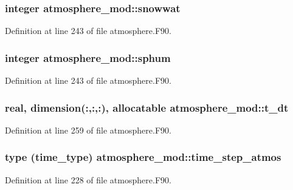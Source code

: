 \subsubsection[{snowwat}]{\setlength{\rightskip}{0pt plus 5cm}integer atmosphere\-\_\-mod\-::snowwat\hspace{0.3cm}{\ttfamily [private]}}\label{classatmosphere__mod_a638b8d7ecc568cfe3706105b9db0affe}


Definition at line 243 of file atmosphere.\-F90.

\subsubsection[{sphum}]{\setlength{\rightskip}{0pt plus 5cm}integer atmosphere\-\_\-mod\-::sphum\hspace{0.3cm}{\ttfamily [private]}}\label{classatmosphere__mod_a794b092a72b516a3078dbff077136a08}


Definition at line 243 of file atmosphere.\-F90.

\subsubsection[{t\-\_\-dt}]{\setlength{\rightskip}{0pt plus 5cm}real, dimension(\-:,\-:,\-:), allocatable atmosphere\-\_\-mod\-::t\-\_\-dt\hspace{0.3cm}{\ttfamily [private]}}\label{classatmosphere__mod_adeb134091a56f59ab4c371a3855a6bdc}


Definition at line 259 of file atmosphere.\-F90.

\subsubsection[{time\-\_\-step\-\_\-atmos}]{\setlength{\rightskip}{0pt plus 5cm}type (time\-\_\-type) atmosphere\-\_\-mod\-::time\-\_\-step\-\_\-atmos\hspace{0.3cm}{\ttfamily [private]}}\label{classatmosphere__mod_a6d42cfe750246363957a2e0aaa251f0b}


Definition at line 228 of file atmosphere.\-F90.

